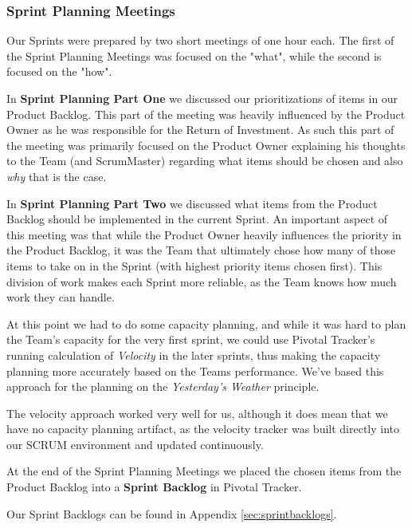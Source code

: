 \subsubsection{Sprint Planning Meetings} 
Our Sprints were prepared by two short meetings of one hour each. The first of the Sprint Planning Meetings was focused on the "what", while the second is focused on the "how".

In \textbf{Sprint Planning Part One}  we discussed our prioritizations of items in our Product Backlog. This part of the meeting was heavily influenced by the Product Owner as he was responsible for the Return of Investment. As such this part of the meeting was primarily focused on the Product Owner explaining his thoughts to the Team (and ScrumMaster) regarding what items should be chosen and also \textit{why} that is the case.

In \textbf{Sprint Planning Part Two} we discussed what items from the Product Backlog should be implemented in the current Sprint. An important aspect of this meeting was that while the Product Owner heavily influences the priority in the Product Backlog, it was the Team that ultimately chose how many of those items to take on in the Sprint (with highest priority items chosen first). This division of work makes each Sprint more reliable, as the Team knows how much work they can handle.

At this point we had to do some capacity planning, and while it was hard to plan the Team's capacity for the very first sprint, we could use Pivotal Tracker's running calculation of \textit{Velocity} in the later sprints, thus making the capacity planning more accurately based on the Teams performance. We've based this approach for the planning on the \textit{Yesterday's Weather} principle\cite{fowleryesterday}.

The velocity approach worked very well for us, although it does mean that we have no capacity planning artifact, as the velocity tracker was built directly into our SCRUM environment and updated continuously.

At the end of the Sprint Planning Meetings we placed the chosen items from the Product Backlog into a \textbf{Sprint Backlog} in Pivotal Tracker.

Our Sprint Backlogs can be found in Appendix \ref{sec:sprintbacklogs}.
